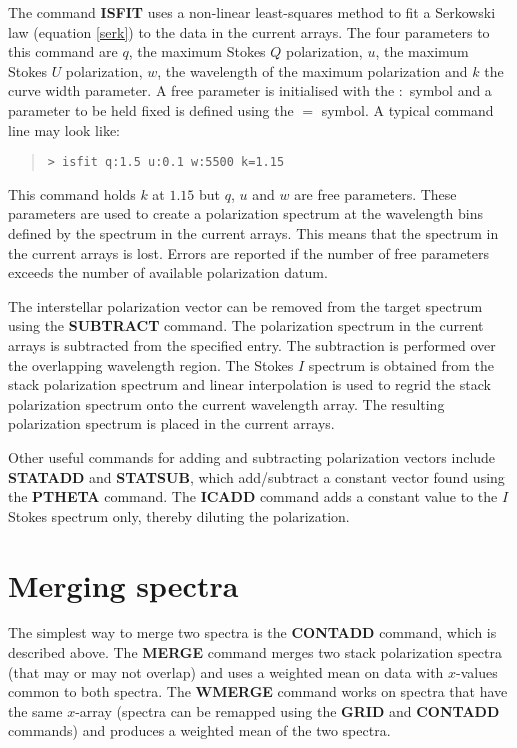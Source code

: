 The command {\bf ISFIT} uses a non-linear least-squares method to fit
a Serkowski law (equation \ref{serk}) to the data in the current
arrays. The four parameters to this command are $q$, the maximum
Stokes $Q$ polarization, $u$, the maximum Stokes $U$ polarization,
$w$, the wavelength of the maximum polarization and $k$ the curve
width parameter. A free parameter is initialised with the $:$ symbol
and a parameter to be held fixed is defined using the $=$ symbol. A
typical command line may look like:

\begin{quote}
{\tt  > isfit q:1.5 u:0.1 w:5500 k=1.15} 
\end{quote}

This command holds $k$ at $1.15$ but $q$, $u$  and $w$ are free
parameters. These parameters are used to create a polarization spectrum
at the wavelength bins defined by the spectrum in the current arrays.
This means that the spectrum in the current arrays is lost.  Errors are
reported if the number of free parameters exceeds the number of
available polarization datum.

The interstellar polarization vector can be removed from the target
spectrum using the {\bf SUBTRACT} command. The polarization spectrum
in the current arrays is subtracted from the specified entry. The
subtraction is performed over the overlapping wavelength region. The
Stokes $I$ spectrum is obtained from the stack polarization spectrum
and linear interpolation is used to regrid the stack polarization
spectrum onto the current wavelength array. The resulting polarization
spectrum is placed in the current arrays.

Other useful commands for adding and subtracting polarization vectors
include {\bf STATADD} and {\bf STATSUB}, which add/subtract a
constant vector found using the {\bf PTHETA} command. The {\bf ICADD}
command adds a constant value to the $I$ Stokes spectrum only, thereby
diluting the polarization. 

\section{Merging spectra}

The simplest way to merge two spectra is the {\bf CONTADD} command,
which is described above. The {\bf MERGE} command merges two stack
polarization spectra (that may or may not overlap) and uses a weighted
mean on data with $x$-values common to both spectra. The {\bf WMERGE}
command works on spectra that have the same $x$-array (spectra can be
remapped using  the {\bf GRID} and {\bf CONTADD} commands) and
produces a weighted mean of the two spectra.

